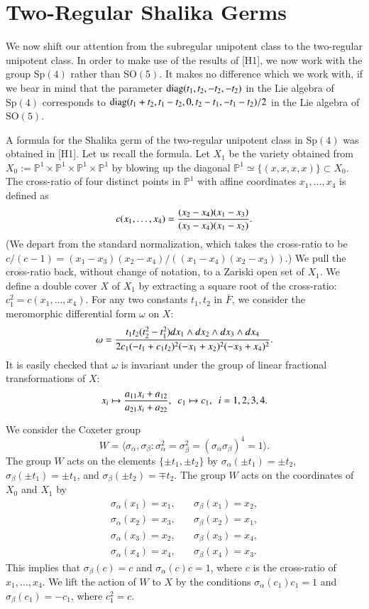 \documentclass{amsart}
\newcommand\bP{{\mathbb P}}
\newcommand\diag{\hbox{diag}}
\newcommand\bF{{\bar F}}
\begin{document}
\section{Two-Regular Shalika Germs}

We now shift our attention from the subregular unipotent class to the two-regular
unipotent class.  In order to make use of the results of [H1], we now
work with the group $\text{Sp}(4)$ rather than $\text{SO}(5)$.  It makes no difference
which we work with, if we bear in mind that the parameter
$\diag(t_1,t_2,-t_2,-t_2)$ in the Lie algebra of $\text{Sp}(4)$ corresponds to
$\diag(t_1+t_2,t_1-t_2,0,t_2-t_1,-t_1-t_2)/2$ in the Lie algebra of $\text{SO}(5)$.

A formula for the Shalika germ of the two-regular unipotent class in $\text{Sp}(4)$
was obtained in [H1].  Let us recall the formula.  Let $X_1$ be
the variety obtained from $X_0 := \bP^1\times \bP^1\times \bP^1\times
\bP^1$ by blowing up the diagonal 
$\bP^1\simeq \{(x,x,x,x)\} \subset X_0$.
The cross-ratio of four distinct points in $\bP^1$
with affine coordinates $x_1,\ldots,x_4$
is defined as
$$c(x_1,\ldots,x_4) = {(x_2-x_4)(x_1-x_3)\over (x_3-x_4)(x_1-x_2)}.$$
(We depart from the standard normalization,
which takes
the cross-ratio to be $c/(c-1) = (x_1-x_3)(x_2-x_4)/((x_1-x_4)(x_2-x_3))$.)
We pull the cross-ratio back, without change of notation, to a Zariski open
set of $X_1$.  We define a double cover $X$ of $X_1$ by extracting
a square root of the cross-ratio:  $c_1^2 = c(x_1,\ldots,x_4)$.
For any two constants $t_1,t_2$ in $\bF$, we consider the meromorphic 
differential form $\omega$ on $X$:
$$\omega = {t_1 t_2 (t_2^2-t_1^2) dx_1 \wedge dx_2 \wedge dx_3\wedge dx_4\over
         2 c_1 (-t_1 + c_1 t_2)^2 (-x_1+x_2)^2 (-x_3+x_4)^2}.$$
It is easily checked that $\omega$ is invariant under the group of
linear fractional transformations of $X$:
$$x_i \mapsto {a_{11} x_i + a_{12}\over a_{21} x_i + a_{22}},
\ \ c_1\mapsto c_1,\ \ i=1,2,3,4.$$

We consider the Coxeter group $$W = \langle \sigma_\alpha,\sigma_\beta :
\sigma_\alpha^2=\sigma_\beta^2 = (\sigma_\alpha \sigma_\beta)^4 = 1\rangle.$$
The group $W$ acts on the elements $\{\pm t_1,\pm t_2\}$ by
$\sigma_\alpha(\pm t_1) = \pm t_2$, $\sigma_\beta(\pm t_1) = \pm t_1$,
and $\sigma_\beta(\pm t_2) = \mp t_2$.
The group $W$ acts on the coordinates of $X_0$ and $X_1$ by 
\begin{align*} \sigma_\alpha(x_1) = x_1, &\quad \sigma_\beta(x_1) = x_2,\\
         \sigma_\alpha(x_2) = x_3, &\quad \sigma_\beta(x_2) = x_1,\\
         \sigma_\alpha(x_3) = x_2, &\quad \sigma_\beta(x_3) = x_4,\\
         \sigma_\alpha(x_4) = x_4, &\quad \sigma_\beta(x_4) = x_3.
  \end{align*}
This implies that $\sigma_\beta(c) = c$ and $\sigma_\alpha(c) c=1$,
where $c$ is the cross-ratio of $x_1,\ldots,x_4$.  We lift the
action of $W$ to $X$ by the conditions $\sigma_\alpha(c_1) c_1 = 1$ and
$\sigma_\beta(c_1) = -c_1$, where $c_1^2 = c$.
\end{document}
